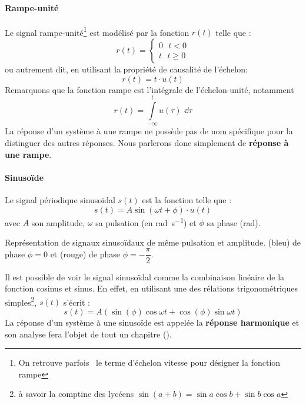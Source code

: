 \paragraph{Rampe-unité}
Le signal rampe-unité\footnote{On retrouve parfois~\cite{sueurautomatique} 
le terme d'échelon vitesse pour désigner la fonction rampe} est
modélisé par la fonction $r(t)$ telle que :
\[
    r(t)=
    \begin{cases}
	0\,\,\,\,t<0 \\
	t\,\,\,\,t\geq0 
    \end{cases}
\]
ou autrement dit, en utilisant la propriété de causalité de l'échelon:
\[
    r(t)=t\cdot u(t)
\]
Remarquons que la fonction rampe est l'intégrale de l'échelon-unité, notamment 
\[
    r(t)=\int\limits_{-\infty}^{t} u(\tau)\,\,\dd{\tau}
\]
La réponse d'un système à une rampe ne possède pas de nom spécifique 
pour la distinguer des autres réponses. Nous parlerons donc simplement 
de \textbf{réponse à une rampe}. 
\paragraph{Sinuso\"ide}
Le signal périodique sinuso\"idal $s(t)$ est la fonction telle que :
\[
    s(t)=A\sin{(\omega t +\phi)}\cdot u(t)
\]
avec $A$ son amplitude, $\omega$ sa pulsation (en \si{\radian\per\second}) 
et $\phi$ sa phase (\si{\radian}).
\begin{marginfigure}[-4em]
    \centering
    \resizebox{\linewidth}{!}{}
    \caption{Représentation de signaux sinuso\"idaux de même pulsation 
             et amplitude. (bleu) de phase $\phi=0$ et 
            (rouge) de phase $\phi=-\dfrac{\pi}{2}$.\label{fig-sin}}
\end{marginfigure}
Il est possible de voir le signal sinuso\"idal comme la combinaison
linéaire de la fonction cosinus et sinus. En effet, en utilisant une 
des rélations trigonométriques simples\footnote{à savoir la comptine des 
lycéens $\sin(a+b)=\sin{a}\cos{b}+\sin{b}\cos{a}$}, $s(t)$ s'écrit :
\[
    s(t)=A(\sin(\phi)\cos{\omega t}+\cos(\phi)\sin{\omega t})
\]
La réponse d'un système à une sinuso\"ide est appelée la 
\textbf{réponse harmonique} et son analyse fera l'objet de tout 
un chapitre ().

